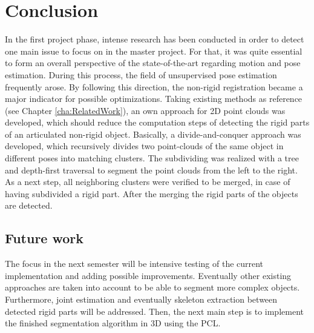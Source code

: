 \chapter{Conclusion}
\label{cha:Closing}

In the first project phase, intense research has been conducted in order to detect one main issue to focus on in the master project. For that, it was quite essential to form an overall perspective of the state-of-the-art regarding motion and pose estimation. During this process, the field of unsupervised pose estimation frequently arose. By following this direction, the non-rigid registration became a major indicator for possible optimizations. Taking existing methods as reference (see Chapter \ref{cha:RelatedWork}), an own approach for 2D point clouds was developed, which should reduce the computation steps of detecting the rigid parts of an articulated non-rigid object. Basically, a divide-and-conquer approach was developed, which recursively divides two point-clouds of the same object in different poses into matching clusters. The subdividing was realized with a tree and depth-first traversal to segment the point clouds from the left to the right. As a next step, all neighboring clusters were verified to be merged, in case of having subdivided a rigid part. After the merging the rigid parts of the objects are detected. 








	
\section{Future work}
	
The focus in the next semester will be intensive testing of the current implementation and adding possible improvements. Eventually other existing approaches are taken into account to be able to segment more complex objects. Furthermore, joint estimation and eventually skeleton extraction between detected rigid parts will be addressed. Then, the next main step is to implement the finished segmentation algorithm in 3D using the PCL.

